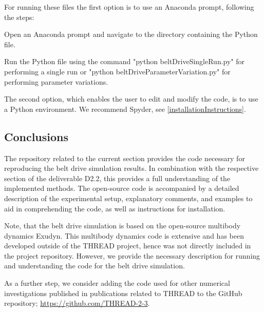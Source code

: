 For running these files the first option is to use an Anaconda prompt, following the steps:
\bi
\item Open an Anaconda prompt and navigate to the directory containing the Python file. %
\item Run the Python file using the command "python beltDriveSingleRun.py" for performing a single run or "python beltDriveParameterVariation.py" for performing parameter variations. 
\ei

The second option, which enables the user to edit and modify the code, is to use a Python environment. We recommend Spyder, see \ref{installationInstructions}.

\subsection{Conclusions}
The repository related to the current section provides the code necessary for reproducing the belt drive simulation results. 
In combination with the respective section of the deliverable D2.2, this provides a full understanding of the implemented methods. 
The open-source code is accompanied by a detailed description of the experimental setup, explanatory comments, and examples to aid in comprehending the code, as well as instructions for installation. 

Note, that the belt drive simulation is based on the open-source multibody dynamics Exudyn. This multibody dynamics code is extensive and has been developed outside of the THREAD project, hence was not directly included in the project repository. However, we provide the necessary description for running and understanding the code for the belt drive simulation.

As a further step, we consider adding the code used for other numerical investigations published in publications related to THREAD to the GitHub repository; \url{https://github.com/THREAD-2-3}.

